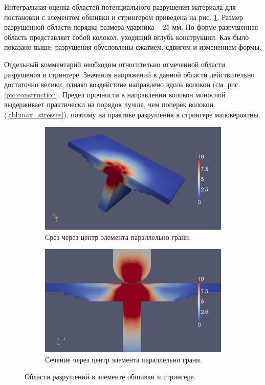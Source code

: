 \clearpage
\newpage

Интегральная оценка областей потенциального разрушения материала для постановки с элементом обшивки и стрингером приведена на рис. \ref{pic:pkm_experiment_wing_stringer_result}. Размер разрушенной области порядка размера ударника -- 25 мм. По форме разрушенная область представляет собой колокол, уходящий вглубь конструкции. Как было показано выше, разрушения обусловлены сжатием, сдвигом и изменением формы.

Отдельный комментарий необходим относительно отмеченной области разрушения в стрингере. Значения напряжений в данной области действительно достаточно велики, однако воздействие направлено вдоль волокон (см. рис. \ref{pic:construction}. Предел прочности в направлении волокон монослой выдерживает практически на порядок лучше, чем поперёк волокон (\ref{tbl:max_stresses}), поэтому на практике разрушения в стрингере маловероятны.

\begin{figure}[htp]
\begin{subfigure}[b]{\textwidth}
\center
\includegraphics[width=\textwidth]{png/pkm-experiment/wing-stringer/sum-3d.png}
\caption{Срез через центр элемента параллельно грани.}
\end{subfigure}
\begin{subfigure}[b]{\textwidth}
\center
\includegraphics[width=\textwidth]{png/pkm-experiment/wing-stringer/sum.png}
\caption{Сечение через центр элемента параллельно грани.}
\end{subfigure}
\caption{Области разрушений в элементе обшивки и стрингере.}
\label{pic:pkm_experiment_wing_stringer_result}
\end{figure}

